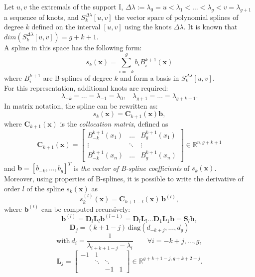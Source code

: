 Let $u,v$ the extremals of the support I, $\Delta\lambda := \lambda_0=u < \lambda_1< \dots < \lambda_g < v = \lambda_{g+1} $ a sequence of knots, and $S_k^{\Delta\lambda}[u,v]$ the vector space of polynomial splines of degree $k$ defined on the interval $[u,v]$ using the knots $\Delta\lambda$. It is known that  $dim(S_k^{\Delta\lambda}[u,v]) = g + k + 1$. \\
A spline in this space has the following form:
\[  s_k(\textbf{x})=\sum\limits_{i=-k}^{g}b_iB_i^{k+1}(\textbf{x}) \]
where ${B_i^{k+1}}$ are B-splines of degree $k$ and form a basis in $S_k^{\Delta\lambda}[u,v]$. \\
For this representation, additional knots are required:
\[  \lambda_{-k}= \dots = \lambda_{-1} = \lambda_0,  \ \ \ \ \lambda_{g+1}= \dots = \lambda_{g+k+1}. \]
In matrix notation, the spline can be rewritten as:
\[  s_k(\textbf{x})=  \textbf{C}_{k+1}(\textbf{x})\textbf{b}, \]
where $ \textbf{C}_{k+1}(\textbf{x})$ is the \textit{collocation matrix}, defined as
\[  \textbf{C}_{k+1}(\textbf{x}) =
\begin{bmatrix}
B_{-k}^{k+1}(x_1)  & \dots  & B_{g}^{k+1}(x_1) \\
\vdots & \ddots & \vdots \\
B_{-k}^{k+1}(x_n) &  \dots  & B_{g}^{k+1}(x_n)
\end{bmatrix} \in \mathbb{R}^{n, g+k+1} \]
and  $\textbf{b}= [ b_{-k}, \dots, b_{g}]^T$ is \textit{the vector of B-spline coefficients} of $s_k(\textbf{x})$.\\
Moreover, using properties of B-splines, it is possible to write the derivative of order $l$ of the spline $s_k(\textbf{x})$ as
\[  s_k^{(l)}(\textbf{x})=  \textbf{C}_{k+1-l}(\textbf{x}) \, \textbf{b}^{(l)}, \]
where $\textbf{b}^{(l)}$ can be computed recursively:
\[ \textbf{b}^{(l)} = \textbf{D}_l \textbf{L}_l \textbf{b}^{(l-1)}   =  \textbf{D}_l \textbf{L}_l \dots \textbf{D}_1 \textbf{L}_1\textbf{b} = \textbf{S}_l\textbf{b}, \]
\[ \textbf{D}_j =  (k+1-j) \, \text{diag}(d_{-k+j},\dots, d_g)    \]
\[ \text{with} \ d_i = \frac{1}{\lambda_{i+k+1-j}-\lambda_i} \qquad \forall i = -k+j,\dots, g,  \]
\[ \textbf{L}_j =  \begin{bmatrix}
-1  & 1 &  &\\
 & \ddots & \ddots&\\
 & & -1&1
\end{bmatrix}  \in \mathbb{R}^{g+k+1-j,g+k+2-j}.\]

